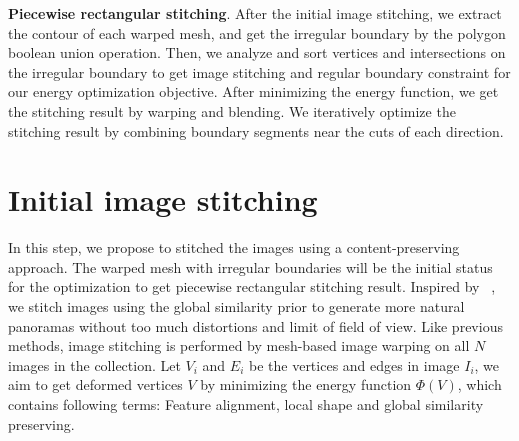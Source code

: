 \documentclass[10pt,journal,compsoc]{IEEEtran}
\begin{document}
\textbf{Piecewise rectangular stitching}.
After the initial image stitching, we extract the contour of each warped mesh, and get the irregular boundary by the polygon boolean union operation.
Then, we analyze and sort vertices and intersections on the irregular boundary to get image stitching and regular boundary constraint for our energy optimization objective. After minimizing the energy function, we get the stitching result by warping and blending. We iteratively optimize the stitching result by combining boundary segments near the cuts of each direction.

\section{Initial image stitching}
\label{sec:Initial image stitching}
%
In this step, we propose to stitched the images using a content-preserving approach.  The warped mesh with irregular boundaries will be the initial status for the optimization to get piecewise rectangular stitching result. 
 Inspired by ~\cite{conf/eccv/ChenC16}, we stitch images using the global similarity prior to generate more natural panoramas without too much distortions and limit of field of view.
 Like previous methods, image stitching is performed by mesh-based image warping on all $N$ images in the collection.
 Let $V_i$ and $E_i$ be the vertices and edges in image $I_i$, we aim to get deformed vertices $V$ by minimizing the energy function $\Phi(V)$, which contains following terms: Feature alignment, local shape and global similarity preserving.
\end{document}
